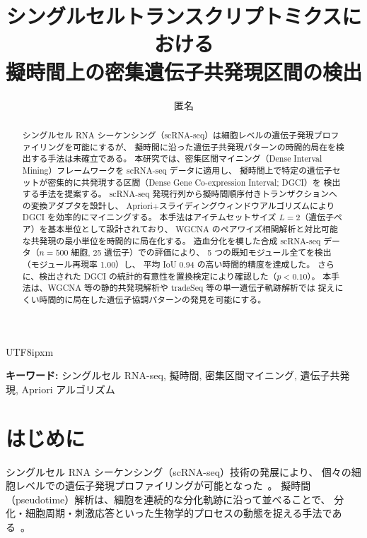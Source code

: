 \documentclass[11pt,a4paper]{article}
\begin{document}
\begin{CJK}{UTF8}{ipxm}

\title{シングルセルトランスクリプトミクスにおける\\擬時間上の密集遺伝子共発現区間の検出}
\author{匿名}
\date{}
\maketitle

\begin{abstract}
シングルセル RNA シーケンシング（scRNA-seq）は細胞レベルの遺伝子発現プロファイリングを可能にするが、
擬時間に沿った遺伝子共発現パターンの時間的局在を検出する手法は未確立である。
本研究では、密集区間マイニング（Dense Interval Mining）フレームワークを scRNA-seq データに適用し、
擬時間上で特定の遺伝子セットが密集的に共発現する区間（Dense Gene Co-expression Interval; DGCI）を
検出する手法を提案する。
scRNA-seq 発現行列から擬時間順序付きトランザクションへの変換アダプタを設計し、
Apriori+スライディングウィンドウアルゴリズムにより DGCI を効率的にマイニングする。
本手法はアイテムセットサイズ $L=2$（遺伝子ペア）を基本単位として設計されており、
WGCNA のペアワイズ相関解析と対比可能な共発現の最小単位を時間的に局在化する。
造血分化を模した合成 scRNA-seq データ（$n=500$ 細胞, 25 遺伝子）での評価により、
5 つの既知モジュール全てを検出（モジュール再現率 1.00）し、
平均 IoU 0.94 の高い時間的精度を達成した。
さらに、検出された DGCI の統計的有意性を置換検定により確認した（$p < 0.10$）。
本手法は、WGCNA 等の静的共発現解析や tradeSeq 等の単一遺伝子軌跡解析では
捉えにくい時間的に局在した遺伝子協調パターンの発見を可能にする。
\end{abstract}

\noindent\textbf{キーワード:}
シングルセル RNA-seq, 擬時間, 密集区間マイニング, 遺伝子共発現, Apriori アルゴリズム

\section{はじめに}
\label{sec:intro}

シングルセル RNA シーケンシング（scRNA-seq）技術の発展により、
個々の細胞レベルでの遺伝子発現プロファイリングが可能となった~\cite{trapnell2014dynamics}。
擬時間（pseudotime）解析は、細胞を連続的な分化軌跡に沿って並べることで、
分化・細胞周期・刺激応答といった生物学的プロセスの動態を捉える手法である~\cite{street2018slingshot,haghverdi2016diffusion}。


\end{CJK}
\end{document}
